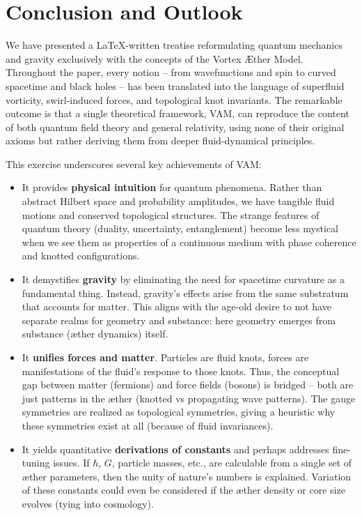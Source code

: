 \documentclass[a4paper,12pt]{article}
\begin{document}
\section{Conclusion and Outlook}
    We have presented a LaTeX-written treatise reformulating quantum mechanics and gravity exclusively with the concepts of the Vortex Æther Model. Throughout the paper, every notion – from wavefunctions and spin to curved spacetime and black holes – has been translated into the language of superfluid vorticity, swirl-induced forces, and topological knot invariants. The remarkable outcome is that a single theoretical framework, VAM, can reproduce the content of both quantum field theory and general relativity, using none of their original axioms but rather deriving them from deeper fluid-dynamical principles.

    This exercise underscores several key achievements of VAM:
    \begin{itemize}
        \item It provides \textbf{physical intuition} for quantum phenomena. Rather than abstract Hilbert space and probability amplitudes, we have tangible fluid motions and conserved topological structures. The strange features of quantum theory (duality, uncertainty, entanglement) become less mystical when we see them as properties of a continuous medium with phase coherence and knotted configurations.
        \item It demystifies \textbf{gravity} by eliminating the need for spacetime curvature as a fundamental thing. Instead, gravity’s effects arise from the same substratum that accounts for matter. This aligns with the age-old desire to not have separate realms for geometry and substance: here geometry emerges from substance (æther dynamics) itself.
        \item It \textbf{unifies forces and matter}. Particles are fluid knots, forces are manifestations of the fluid’s response to those knots. Thus, the conceptual gap between matter (fermions) and force fields (bosons) is bridged – both are just patterns in the æther (knotted vs propagating wave patterns). The gauge symmetries are realized as topological symmetries, giving a heuristic why these symmetries exist at all (because of fluid invariances).
        \item It yields quantitative \textbf{derivations of constants} and perhaps addresses fine-tuning issues. If $\hbar$, $G$, particle masses, etc., are calculable from a single set of æther parameters, then the unity of nature’s numbers is explained. Variation of these constants could even be considered if the æther density or core size evolves (tying into cosmology).
    \end{itemize}
\end{document}
